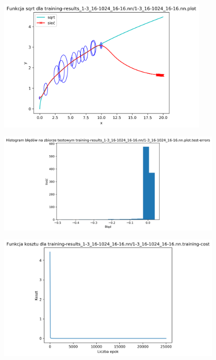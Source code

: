 \documentclass{classrep}
\begin{document}
{{{\begin{figure}[!htbp]
                \end{figure}
                \FloatBarrier
                \begin{figure}[!htbp]
                    \centering
                    \includegraphics[width=105mm]{wykresy/1-3_16-1024_16-16_nn_plot.png}
                \end{figure}
                \begin{figure}[!htbp]
                    \centering
                    \includegraphics[width=140mm]{wykresy/1-3_16-1024_16-16_nn_plot_test-errors.png}
                \end{figure}
                \begin{figure}[!htbp]
                    \centering
                    \includegraphics[width=120mm]{wykresy/1-3_16-1024_16-16_nn_training-cost.png}

\end{figure}}}}
\end{document}
